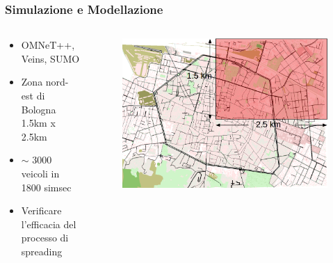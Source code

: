 \documentclass{beamer}
\begin{document}
\begin{frame}
  \frametitle{Simulazione e Modellazione}
  \begin{columns}
    \begin{column}{0.60\textwidth}
      \begin{itemize}
	\item OMNeT++, Veins, SUMO
	\item Zona nord-est di Bologna 1.5km x 2.5km
	\item $\scriptstyle\mathtt{\sim}$ 3000 veicoli in 1800 simsec
	\item Verificare l’efficacia del processo di spreading
      \end{itemize}
    \end{column}

    \begin{column}{0.40\textwidth}
      \begin{figure}
      \includegraphics[width=\columnwidth]{img/sumo-bolo2.png}
      \end{figure}
    \end{column}
  \end{columns}
\end{frame}
\end{document}
